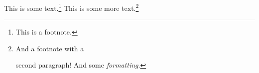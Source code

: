 
  This is some text.\footnote{This is a footnote.} This is some more text.\footnote{And a footnote with a

  second paragraph! And some \emph{formatting}.}

